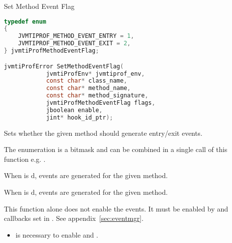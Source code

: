 \begin{apidef}{Set Method Event Flag}
\begin{lstlisting}[language=C]
typedef enum
{
    JVMTIPROF_METHOD_EVENT_ENTRY = 1,
    JVMTIPROF_METHOD_EVENT_EXIT = 2,
} jvmtiProfMethodEventFlag;

jvmtiProfError SetMethodEventFlag(
            jvmtiProfEnv* jvmtiprof_env,
            const char* class_name,
            const char* method_name,
            const char* method_signature,
            jvmtiProfMethodEventFlag flags,
            jboolean enable,
            jint* hook_id_ptr);
\end{lstlisting}

\begin{apidesc}
Sets whether the given method should generate entry/exit events.

\medskip
The  enumeration is a bitmask and can be combined in a single call of this function e.g. .

\medskip
When  is d,  events are generated for the given method.

\medskip
When  is d,  events are generated for the given method.

\medskip
This function alone does not enable the events. It must be enabled by  and callbacks set in . See appendix~\ref{sec:eventmgr}.
\end{apidesc}

\begin{apiphase}
\apiphaseany
\end{apiphase}

\begin{apicap}
\begin{itemize}
\item {} is necessary to enable  and .
\end{itemize}
\end{apicap}

\begin{apiparam}
\end{apiparam}


\end{apidef}
